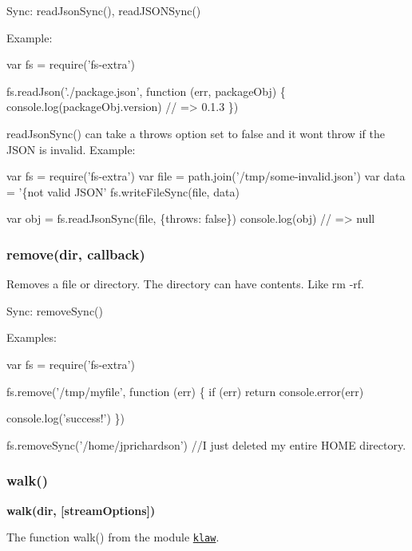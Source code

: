 Sync\+: {\ttfamily read\+Json\+Sync()}, {\ttfamily read\+J\+S\+O\+N\+Sync()}

Example\+:


\begin{DoxyCode}
var fs = require('fs-extra')

fs.readJson('./package.json', function (err, packageObj) \{
  console.log(packageObj.version) // => 0.1.3
\})
\end{DoxyCode}


{\ttfamily read\+Json\+Sync()} can take a {\ttfamily throws} option set to {\ttfamily false} and it won\textquotesingle{}t throw if the J\+S\+ON is invalid. Example\+:


\begin{DoxyCode}
var fs = require('fs-extra')
var file = path.join('/tmp/some-invalid.json')
var data = '\{not valid JSON'
fs.writeFileSync(file, data)

var obj = fs.readJsonSync(file, \{throws: false\})
console.log(obj) // => null
\end{DoxyCode}


\subsubsection*{remove(dir, callback)}

Removes a file or directory. The directory can have contents. Like {\ttfamily rm -\/rf}.

Sync\+: {\ttfamily remove\+Sync()}

Examples\+:


\begin{DoxyCode}
var fs = require('fs-extra')

fs.remove('/tmp/myfile', function (err) \{
  if (err) return console.error(err)

  console.log('success!')
\})

fs.removeSync('/home/jprichardson') //I just deleted my entire HOME directory.
\end{DoxyCode}


\subsubsection*{walk()}

{\bfseries walk(dir, \mbox{[}stream\+Options\mbox{]})}

The function {\ttfamily walk()} from the module \href{https://github.com/jprichardson/node-klaw}{\tt {\ttfamily klaw}}.

